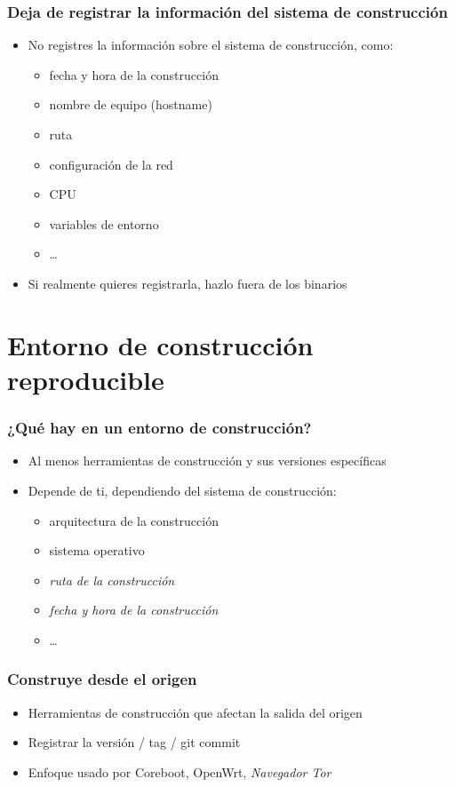 \documentclass[14pt,aspectratio=169]{beamer}
\begin{document}
\begin{frame}
 \frametitle{Deja de registrar la información del sistema de construcción}

 \begin{itemize}
  \item No registres la información sobre el sistema de construcción, como:
   \begin{itemize}
    \item fecha y hora de la construcción
    \item nombre de equipo (hostname)
    \item ruta
    \item configuración de la red
    \item CPU
    \item variables de entorno
    \item …
   \end{itemize}
  \item<2> Si realmente quieres registrarla, hazlo fuera de los binarios
 \end{itemize}
\end{frame}

\section{Entorno de construcción reproducible}

\begin{frame}
 \frametitle{¿Qué hay en un entorno de construcción?}

 \begin{itemize}
  \item Al menos herramientas de construcción y sus versiones específicas
  \item<2> Depende de ti, dependiendo del sistema de construcción:
   \begin{itemize}
    \item arquitectura de la construcción
    \item sistema operativo
    \item \textit{ruta de la construcción}
    \item \textit{fecha y hora de la construcción}
    \item …
   \end{itemize}
 \end{itemize}
\end{frame}

\begin{frame}
 \frametitle{Construye desde el origen}

 \begin{itemize}
  \item Herramientas de construcción que afectan la salida del origen
  \item Registrar la versión / tag / git commit
  \item Enfoque usado por Coreboot, OpenWrt, \textit{Navegador Tor}
 \end{itemize}
\end{frame}
\end{document}
